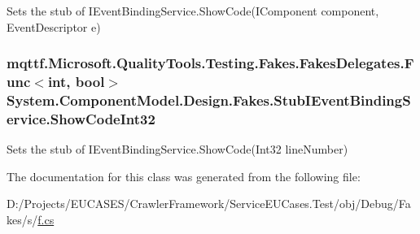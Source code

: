 Sets the stub of I\-Event\-Binding\-Service.\-Show\-Code(\-I\-Component component, Event\-Descriptor e)

\hypertarget{class_system_1_1_component_model_1_1_design_1_1_fakes_1_1_stub_i_event_binding_service_a736794321b5baca616aeae4b8e811586}{
\subsubsection[{Show\-Code\-Int32}]{\setlength{\rightskip}{0pt plus 5cm}mqttf.\-Microsoft.\-Quality\-Tools.\-Testing.\-Fakes.\-Fakes\-Delegates.\-Func$<$int, bool$>$ System.\-Component\-Model.\-Design.\-Fakes.\-Stub\-I\-Event\-Binding\-Service.\-Show\-Code\-Int32}}\label{class_system_1_1_component_model_1_1_design_1_1_fakes_1_1_stub_i_event_binding_service_a736794321b5baca616aeae4b8e811586}


Sets the stub of I\-Event\-Binding\-Service.\-Show\-Code(\-Int32 line\-Number)



The documentation for this class was generated from the following file\-:\begin{DoxyCompactItemize}
\item 
D\-:/\-Projects/\-E\-U\-C\-A\-S\-E\-S/\-Crawler\-Framework/\-Service\-E\-U\-Cases.\-Test/obj/\-Debug/\-Fakes/s/\hyperlink{s_2f_8cs}{f.\-cs}\end{DoxyCompactItemize}
